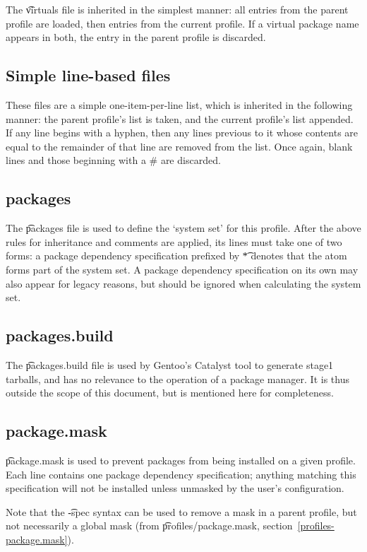 The \t{virtuals} file is inherited in the simplest manner: all entries from the parent profile are
loaded, then entries from the current profile. If a virtual package name appears in both, the entry
in the parent profile is discarded.

\subsection{Simple line-based files}
\label{sec:line-stacking}
These files are a simple one-item-per-line list, which is inherited in the following manner: the
parent profile's list is taken, and the current profile's list appended. If any line begins with a
hyphen, then any lines previous to it whose contents are equal to the remainder of that line are
removed from the list. Once again, blank lines and those beginning with a \# are discarded.

\subsection{packages}
The \t{packages} file is used to define the `system set' for this profile.
After the above rules for inheritance and comments are applied, its lines must take one of two
forms: a package dependency specification prefixed by \t{*} denotes that the atom forms part of the
system set. A package dependency specification on its own may also appear for legacy reasons, but
should be ignored when calculating the system set.

\subsection{packages.build}
The \t{packages.build} file is used by Gentoo's Catalyst tool to generate stage1 tarballs, and has
no relevance to the operation of a package manager. It is thus outside the scope of this document,
but is mentioned here for completeness.

\subsection{package.mask}
\t{package.mask} is used to prevent packages from being installed on a given profile. Each line
contains one package dependency specification; anything matching this specification will not be
installed unless unmasked by the user's configuration.

Note that the \t{-spec} syntax can be used to remove a mask in a parent profile, but not
necessarily a global mask (from \t{profiles/package.mask}, section~\ref{profiles-package.mask}).

